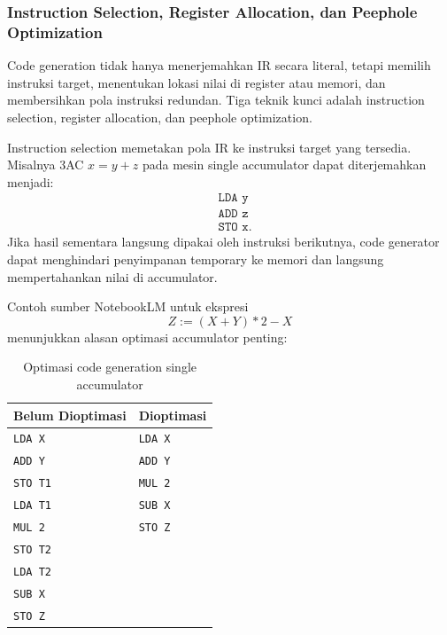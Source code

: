 \subsubsection{Instruction Selection, Register Allocation, dan Peephole Optimization}

\begin{jawab}
Code generation tidak hanya menerjemahkan IR secara literal, tetapi memilih instruksi target, menentukan lokasi nilai di register atau memori, dan membersihkan pola instruksi redundan. Tiga teknik kunci adalah instruction selection, register allocation, dan peephole optimization.
\end{jawab}

Instruction selection memetakan pola IR ke instruksi target yang tersedia. Misalnya 3AC $x=y+z$ pada mesin single accumulator dapat diterjemahkan menjadi:
\[
\begin{aligned}
    &\texttt{LDA y}\\
    &\texttt{ADD z}\\
    &\texttt{STO x}.
\end{aligned}
\]
Jika hasil sementara langsung dipakai oleh instruksi berikutnya, code generator dapat menghindari penyimpanan temporary ke memori dan langsung mempertahankan nilai di accumulator.

Contoh sumber NotebookLM untuk ekspresi
\[
    Z := (X+Y)*2-X
\]
menunjukkan alasan optimasi accumulator penting:

\begin{table}[H]
\centering
\small
\begin{tabularx}{\textwidth}{|X|X|}
\hline
\textbf{Belum Dioptimasi} & \textbf{Dioptimasi} \\
\hline
\texttt{LDA X} & \texttt{LDA X} \\
\texttt{ADD Y} & \texttt{ADD Y} \\
\texttt{STO T1} & \texttt{MUL 2} \\
\texttt{LDA T1} & \texttt{SUB X} \\
\texttt{MUL 2} & \texttt{STO Z} \\
\texttt{STO T2} & \\
\texttt{LDA T2} & \\
\texttt{SUB X} & \\
\texttt{STO Z} & \\
\hline
\end{tabularx}
\caption{Optimasi code generation single accumulator}
\label{tab:single-accumulator-codegen}
\end{table}

